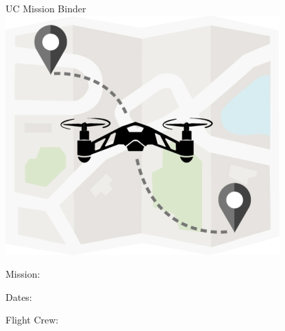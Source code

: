 \thispagestyle{empty}
\begin{center}
\vspace*{9em}
{\Huge UC Mission Binder}\\
\vspace*{9em}
\includegraphics{cover.jpg}\\
\vspace*{9em}
{\huge 

Mission: \hrulefill

Dates: \hrulefill

Flight Crew: \hrulefill

}
\vspace*{9em}
\end{center}

\let\maketitle\oldmaketitle
\maketitle